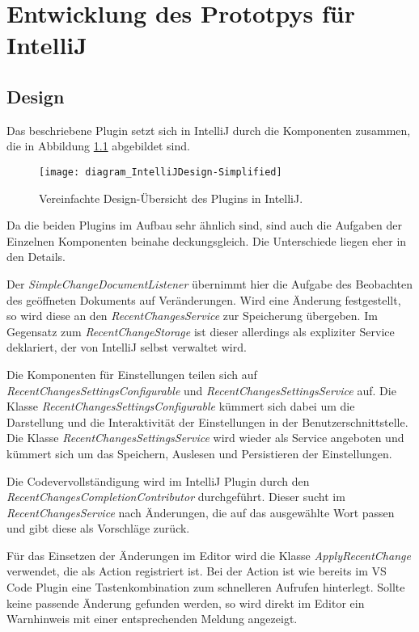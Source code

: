 \chapter{Entwicklung des Prototpys für IntelliJ}
\label{cha:EntwicklungIntelliJ}

\section{Design}
\label{sec:EntwicklungIntelliJ_Design}

Das beschriebene Plugin setzt sich in IntelliJ 
durch die Komponenten zusammen,
die in Abbildung \ref{fig:diagram_IntelliJDesign-Simplified} 
abgebildet sind.

\begin{figure}
    \centering
    \texttt{[image: diagram\_IntelliJDesign-Simplified]}
    \caption{Vereinfachte Design-Übersicht des Plugins in IntelliJ.}
    \label{fig:diagram_IntelliJDesign-Simplified}
\end{figure}

Da die beiden Plugins im Aufbau sehr ähnlich sind, sind auch die Aufgaben der
Einzelnen Komponenten beinahe deckungsgleich. Die Unterschiede liegen eher in
den Details.

Der \emph{SimpleChangeDocumentListener} übernimmt hier die Aufgabe
des Beobachten des geöffneten Dokuments auf Veränderungen. Wird
eine Änderung festgestellt, so wird diese an den \emph{RecentChangesService}
zur Speicherung übergeben. Im Gegensatz zum \emph{RecentChangeStorage}
ist dieser allerdings als expliziter Service deklariert, der von IntelliJ
selbst verwaltet wird.

Die Komponenten für Einstellungen teilen sich auf 
\emph{RecentChangesSettingsConfigurable} und \emph{RecentChangesSettingsService}
auf. Die Klasse \emph{RecentChangesSettingsConfigurable} kümmert sich dabei
um die Darstellung und die Interaktivität der Einstellungen in der Benutzerschnittstelle.
Die Klasse \emph{RecentChangesSettingsService} wird wieder als Service 
angeboten und kümmert sich um das Speichern, Auslesen und Persistieren
der Einstellungen.

Die Codevervollständigung wird im IntelliJ Plugin durch den
\emph{RecentChangesCompletionContributor} durchgeführt. Dieser
sucht im \emph{RecentChangesService} nach Änderungen, die auf
das ausgewählte Wort passen und gibt diese als Vorschläge zurück.

Für das Einsetzen der Änderungen im Editor wird die Klasse
\emph{ApplyRecentChange} verwendet, die als Action registriert ist.
Bei der Action ist wie bereits im VS Code Plugin eine Tastenkombination
zum schnelleren Aufrufen hinterlegt.
Sollte keine passende Änderung gefunden werden, so wird direkt im
Editor ein Warnhinweis mit einer entsprechenden Meldung angezeigt.

